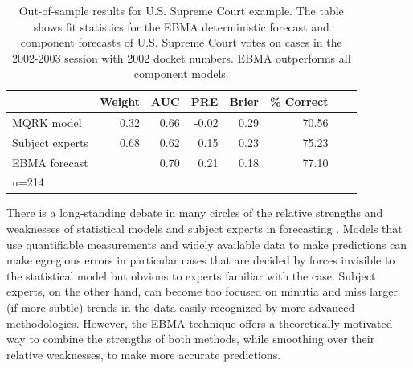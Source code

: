 \documentclass[pdftex,12pt,fullpage,oneside]{amsart}
\begin{document}
\begin{table}[ht]
  \caption{\footnotesize Out-of-sample results for U.S. Supreme Court
    example.  The table shows fit statistics for the EBMA deterministic
    forecast and component forecasts of U.S. Supreme Court votes on
    cases in the 2002-2003 session with 2002 docket numbers.   EBMA
    outperforms all component models. }
\label{SC-Res} \small
\begin{center}
\begin{tabular}{lrrrrrrr}
\toprule
 & Weight & AUC & PRE & Brier & \% Correct   \\ 
\midrule
MQRK model& 0.32  & 0.66 & -0.02 & 0.29 & 70.56   \\ 
Subject experts & 0.68 & 0.62 & 0.15 & 0.23 & 75.23  \\ 
EBMA forecast&  & 0.70 & 0.21 & 0.18 & 77.10  \\ 
\bottomrule
n=214 
\end{tabular}
\end{center}
\end{table}



There is a long-standing debate in many circles of the relative
strengths and weaknesses of statistical models and subject experts in
forecasting \citep[e.g.,][]{Ascher:1979}.  Models that use
quantifiable measurements and widely available data to make
predictions can make egregious errors in particular cases that are
decided by forces invisible to the statistical model but obvious to
experts familiar with the case.  Subject experts, on the other hand,
can become too focused on minutia and miss larger (if more subtle)
trends in the data easily recognized by more advanced methodologies.
However, the EBMA technique offers a theoretically motivated way to
combine the strengths of both methods, while smoothing over their
relative weaknesses, to make more accurate predictions.
\end{document}

